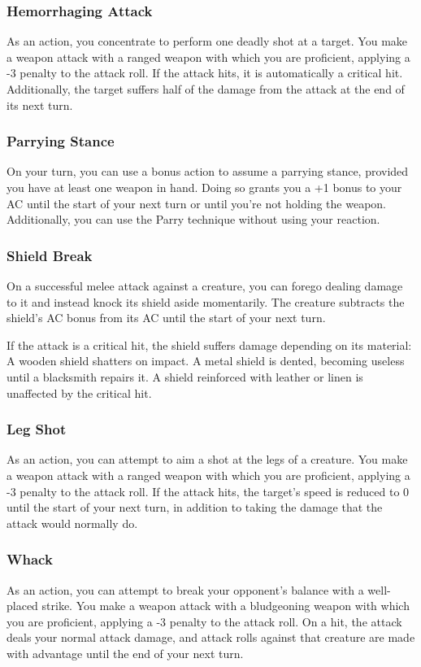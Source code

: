 \subsubsection{Hemorrhaging Attack} \label{tec::hemorrhagingattack}
As an action, you concentrate to perform one deadly shot at a target.
You make a weapon attack with a ranged weapon with which you are proficient, applying a -3 penalty to the attack roll.
If the attack hits, it is automatically a critical hit.
Additionally, the target suffers half of the damage from the attack at the end of its next turn.

\subsubsection{Parrying Stance} \label{tec::parryingstance}
On your turn, you can use a bonus action to assume a parrying stance, provided you have at least one weapon in hand.
Doing so grants you a +1 bonus to your AC until the start of your next turn or until you're not holding the weapon.
Additionally, you can use the Parry technique without using your reaction.

\subsubsection{Shield Break} \label{tec::shieldbreak}
On a successful melee attack against a creature, you can forego dealing damage to it and instead knock its shield aside momentarily.
The creature subtracts the shield's AC bonus from its AC until the start of your next turn.

If the attack is a critical hit, the shield suffers damage depending on its material:
A wooden shield shatters on impact.
A metal shield is dented, becoming useless until a blacksmith repairs it.
A shield reinforced with leather or linen is unaffected by the critical hit.

\subsubsection{Leg Shot} \label{tec::legshot}
As an action, you can attempt to aim a shot at the legs of a creature.
You make a weapon attack with a ranged weapon with which you are proficient, applying a -3 penalty to the attack roll.
If the attack hits, the target's speed is reduced to 0 until the start of your next turn, in addition to taking the damage that the attack would normally do.

\subsubsection{Whack} \label{tec::whack}
As an action, you can attempt to break your opponent's balance with a well-placed strike.
You make a weapon attack with a bludgeoning weapon with which you are proficient, applying a -3 penalty to the attack roll.
On a hit, the attack deals your normal attack damage, and attack rolls against that creature are made with advantage until the end of your next turn.

